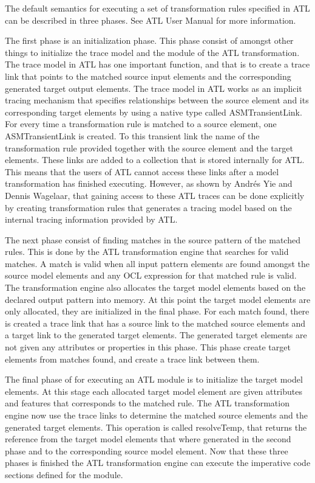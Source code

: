 The default semantics for executing a set of transformation rules specified in
ATL can be described in three phases. See ATL User Manual\cite{ATL_USERMAN} for
more information.

The first phase is an initialization phase. This phase consist of amongst other
things to initialize the trace model and the module of the ATL transformation.
The trace model in ATL has one important function, and that is to create a
trace link that points to the matched source input elements and the
corresponding generated target output elements. The trace model in ATL works as
an implicit tracing mechanism that specifies relationships between the source
element and its corresponding target elements by using a native type called
ASMTransientLink\cite{Wagelaar}. For every time a transformation rule is
matched to a source element, one ASMTransientLink is created. To this transient
link the name of the transformation rule provided together with the source
element and the target elements. These links are added to a collection that is
stored internally for ATL. This means that the users of ATL cannot access these
links after a model transformation has finished executing. However, as shown by
Andr\'{e}s Yie and Dennis Wagelaar\cite{Wagelaar}, that gaining access to these
ATL traces can be done explicitly by creating transformation rules that
generates a tracing model based on the internal tracing information provided by ATL.

The next phase consist of finding matches in the source pattern of the matched
rules. This is done by the ATL transformation engine that searches for valid
matches. A match is valid when all input pattern elements are found amongst
the source model elements and any OCL expression for that matched rule is valid.
The transformation engine also allocates the target model elements based on the
declared output pattern into memory. At this point the target model elements are
only allocated, they are initialized in the final phase. For each match found,
there is created a trace link that has a source link to the matched source
elements and a target link to the generated target elements. The generated
target elements are not given any attributes or properties in this phase. This
phase create target elements from matches found, and create a trace link between
them.

The final phase of for executing an ATL module is to initialize the target model
elements. At this stage each allocated target model element are given
attributes and features that corresponds to the matched rule. The ATL
transformation engine now use the trace links to determine the matched source
elements and the generated target elements. This operation is called
resolveTemp, that returns the reference from the target model elements that
where generated in the second phase and to the corresponding source model
element. Now that these three phases is finished the ATL transformation engine
can execute the imperative code sections defined for the module. 

